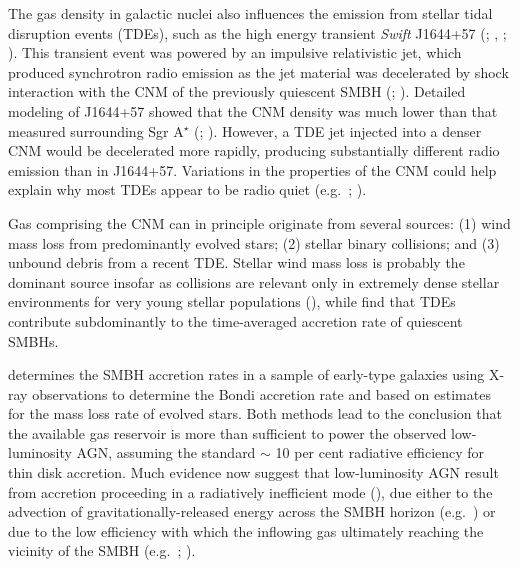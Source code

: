 \documentclass[usenatbib,fleqn]{mn2e}
\newcommand{\Mbh}[1][]{M_{\bullet#1}}
\begin{document}

The gas density in galactic nuclei also influences the emission from
stellar tidal disruption events (TDEs), such as the high energy
transient {\it Swift} J1644+57 (\citealt{Levan+11};
\citealt{Bloom+11}, \citealt{Burrows+11}; \citealt{Zauderer+11}).
This transient event was powered by an impulsive relativistic jet,
which produced synchrotron radio emission as the jet material was
decelerated by shock interaction with the CNM of the previously
quiescent SMBH (\citealt{Giannios&Metzger11}; \citealt{Zauderer+11}).
Detailed modeling of J1644+57 showed that the CNM density was much
lower than that measured surrounding Sgr A$^{\star}$
(\citealt{Metzger+12}; \citealt{BergerZauderer+:2012a}).  However, a TDE jet
injected into a denser CNM would be decelerated more rapidly,
producing substantially different radio emission than in J1644+57.
Variations in the properties of the CNM could help explain why most
TDEs appear to be radio quiet (e.g.~\citealt{Bower+13};
\citealt{VanVelzen+13}).

Gas comprising the CNM can in principle originate from several
sources: (1) wind mass loss from predominantly evolved stars; (2)
stellar binary collisions; and (3) unbound debris from a recent TDE.
Stellar wind mass loss is probably the dominant source insofar as
collisions are relevant only in extremely dense stellar environments
for very young stellar populations (\citealt{Rubin&Loeb11}), while
\citet{MacLeod+13} find that TDEs contribute subdominantly to the
time-averaged accretion rate of quiescent SMBHs.

\citet{Ho:2009a} determines the SMBH accretion rates in a sample of
early-type galaxies using X-ray observations to determine the
Bondi accretion rate and based on estimates for the mass loss rate of
evolved stars.  Both methods lead to the conclusion that the available
gas reservoir is more than sufficient to power the observed
low-luminosity AGN, assuming the standard $\sim$ 10 per cent radiative
efficiency for thin disk accretion.  Much
evidence now suggest that low-luminosity AGN result from accretion
proceeding in a radiatively inefficient mode
(\citealt{Yuan&Narayan14}), due either to the advection of
gravitationally-released energy across the SMBH horizon
(e.g.~\citealt{Narayan&Yi95}) or due to the low efficiency with which the inflowing gas ultimately reaching the vicinity of the SMBH
(e.g.~\citealt{Blandford&Begelman99}; \citealt{Li+13}).
\end{document}
